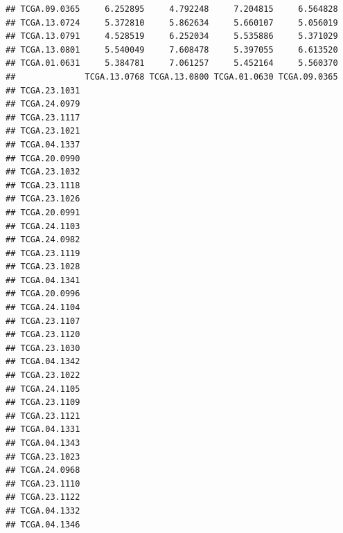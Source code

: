 \documentclass[UTF8]{beamer}\usepackage[]{graphicx}\usepackage[]{color}
\makeatletter
\newenvironment{kframe}{%
 \def\at@end@of@kframe{}%
 \ifinner\ifhmode%
  \def\at@end@of@kframe{\end{minipage}}%
  \begin{minipage}{\columnwidth}%
 \fi\fi%
 \def\FrameCommand##1{\hskip\@totalleftmargin \hskip-\fboxsep
 \colorbox{shadecolor}{##1}\hskip-\fboxsep
     \hskip-\linewidth \hskip-\@totalleftmargin \hskip\columnwidth}%
 \MakeFramed {\advance\hsize-\width
   \@totalleftmargin\z@ \linewidth\hsize
   \@setminipage}}%
 {\par\unskip\endMakeFramed%
 \at@end@of@kframe}
\newenvironment{knitrout}{}{} %
\makeatother
\begin{document}
\begin{frame}[fragile]
\begin{knitrout}
\begin{kframe}
\begin{verbatim}
## TCGA.09.0365     6.252895     4.792248     7.204815     6.564828
## TCGA.13.0724     5.372810     5.862634     5.660107     5.056019
## TCGA.13.0791     4.528519     6.252034     5.535886     5.371029
## TCGA.13.0801     5.540049     7.608478     5.397055     6.613520
## TCGA.01.0631     5.384781     7.061257     5.452164     5.560370
##              TCGA.13.0768 TCGA.13.0800 TCGA.01.0630 TCGA.09.0365
## TCGA.23.1031                                                    
## TCGA.24.0979                                                    
## TCGA.23.1117                                                    
## TCGA.23.1021                                                    
## TCGA.04.1337                                                    
## TCGA.20.0990                                                    
## TCGA.23.1032                                                    
## TCGA.23.1118                                                    
## TCGA.23.1026                                                    
## TCGA.20.0991                                                    
## TCGA.24.1103                                                    
## TCGA.24.0982                                                    
## TCGA.23.1119                                                    
## TCGA.23.1028                                                    
## TCGA.04.1341                                                    
## TCGA.20.0996                                                    
## TCGA.24.1104                                                    
## TCGA.23.1107                                                    
## TCGA.23.1120                                                    
## TCGA.23.1030                                                    
## TCGA.04.1342                                                    
## TCGA.23.1022                                                    
## TCGA.24.1105                                                    
## TCGA.23.1109                                                    
## TCGA.23.1121                                                    
## TCGA.04.1331                                                    
## TCGA.04.1343                                                    
## TCGA.23.1023                                                    
## TCGA.24.0968                                                    
## TCGA.23.1110                                                    
## TCGA.23.1122                                                    
## TCGA.04.1332                                                    
## TCGA.04.1346                                                    

\end{verbatim}
\end{kframe}
\end{knitrout}
\end{frame}
\end{document}
